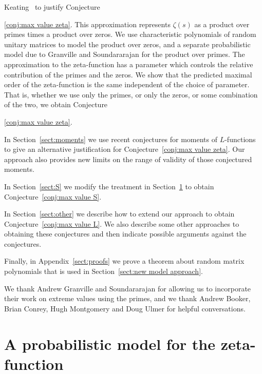 \documentclass[10pt,reqno,twoside]{amsart}
\numberwithin{equation}{section}
\numberwithin{theorem}{section}
\begin{document}
Keating~\cite{GHK} to justify Conjecture~{\ref{conj:max value zeta}.
This approximation represents  $\zeta(s)$ as a product over
primes times a product over zeros. We use characteristic
polynomials of random unitary matrices to model the product over
zeros, and a separate probabilistic model due to Granville and
Soundararajan for the product over primes. The approximation to
the zeta-function has a parameter which controls the relative
contribution of the primes and the zeros.  We show that the
predicted maximal order of the zeta-function is the same
independent of the choice of parameter.  That is, whether we use
only the primes, or only the zeros, or some combination of the two, we obtain
Conjecture~{\ref{conj:max value zeta}.

In Section~\ref{sect:moments} we use recent conjectures for
moments of $L$-functions to give an alternative justification for
Conjecture~\ref{conj:max value zeta}.  Our approach also provides
new limits on the range of validity of those conjectured moments.

In Section~\ref{sect:S} we modify the treatment in
Section~\ref{sect:new model approach} to obtain
Conjecture~\ref{conj:max value S}.

In Section~\ref{sect:other} we describe how to extend our approach
to obtain Conjecture~\ref{conj:max value L}. We also describe some
other approaches to obtaining these conjectures and  then indicate
possible arguments against the conjectures.

Finally, in Appendix~\ref{sect:proofs} we prove a theorem about
random matrix polynomials that is used in Section~\ref{sect:new
model approach}.

We thank Andrew Granville and Soundararajan for allowing us to
incorporate their work on extreme values using the primes, and we
thank Andrew Booker, Brian Conrey, Hugh Montgomery and Doug Ulmer for helpful
conversations.



\section{A probabilistic model for the zeta-function}\label{sect:new model approach}

}}
\end{document}
